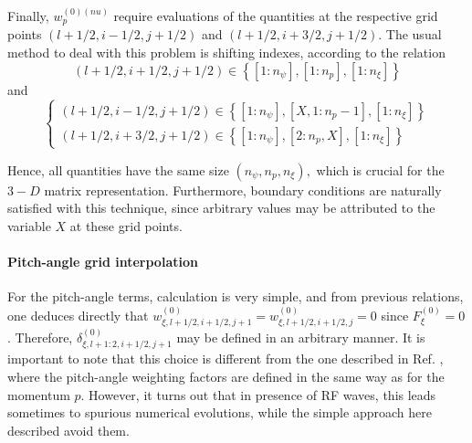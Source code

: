 Finally, $w_{p}^{\left( 0\right) (nu)}$ require evaluations of the
quantities at the respective grid points $\left( l+1/2,i-1/2,j+1/2\right) $
and $\left( l+1/2,i+3/2,j+1/2\right) .$ The usual method to deal with this
problem is shifting indexes, according to the relation
\begin{equation}
\left( l+1/2,i+1/2,j+1/2\right) \in \left\{ \left[ 1:n_{\psi }\right]
,\left[ 1:n_{p}\right] ,\left[ 1:n_{\xi }\right] \right\}
\end{equation}
and
\begin{equation}
\left\{
\begin{array}{l}
\left( l+1/2,i-1/2,j+1/2\right) \in \left\{ \left[ 1:n_{\psi }\right]
,\left[ X,1:n_{p}-1\right] ,\left[ 1:n_{\xi }\right] \right\}  \\
\left( l+1/2,i+3/2,j+1/2\right) \in \left\{ \left[ 1:n_{\psi }\right]
,\left[ 2:n_{p},X\right] ,\left[ 1:n_{\xi }\right] \right\}
\end{array}
\right.
\end{equation}

Hence, all quantities have the same size $\left( n_{\psi },n_{p},n_{\xi
}\right) ,$ which is crucial for the $3-D$ matrix representation.
Furthermore, boundary conditions are naturally satisfied with this
technique, since arbitrary values may be attributed to the variable $X$ at
these grid points.

\paragraph{Pitch-angle grid interpolation}

For the pitch-angle terms, calculation is very simple, and from previous
relations, one deduces directly that $w_{\xi ,l+1/2,i+1/2,j+1}^{\left(
0\right) }=w_{\xi ,l+1/2,i+1/2,j}^{\left( 0\right) }=0$ since $F_{\xi
}^{\left( 0\right) }=0$. Therefore, $\delta _{\xi ,l+1:2,i+1/2,j+1}^{\left(
0\right) }$ may be defined in an arbitrary manner. It is important to note
that this choice is different from the one described in Ref. \cite{biz97},
where the pitch-angle weighting factors are defined in the same way as for
the momentum $p$. However, it turns out that in presence of RF waves, this
leads sometimes to spurious numerical evolutions, while the simple approach
here described avoid them.


